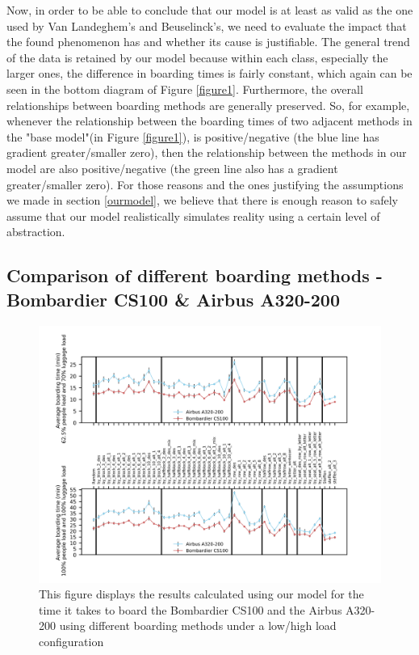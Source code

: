 \documentclass[11pt]{article}
\begin{document}
Now, in order to be able to conclude that our model is at least as valid as the one used by Van Landeghem's and Beuselinck's, we need to evaluate the impact that the found phenomenon has and whether its cause is justifiable. 
The general trend of the data is retained by our model because within each class, especially the larger ones, the difference in boarding times is fairly constant, which again can be seen in the bottom diagram of Figure \ref{figure1}. Furthermore, the overall relationships between boarding methods are generally preserved. So, for example, whenever the relationship between the boarding times of two adjacent methods in the "base model"(in Figure \ref{figure1}), is positive/negative (the blue line has gradient greater/smaller zero), then the relationship between the methods in our model are also positive/negative (the green line also has a gradient greater/smaller zero). For those reasons and the ones justifying the assumptions we made in section \ref{ourmodel}, we believe that there is enough reason to safely assume that our model realistically simulates reality using a certain level of abstraction.  

\subsection{Comparison of different boarding methods - Bombardier CS100 \& Airbus A320-200}
\begin{figure}
	\includegraphics[width=\linewidth]{../../code/AirplaneBoarding/data/figure2/figure2.png}
	\caption{This figure displays the results calculated using our model for the time it takes to board the Bombardier CS100 and the Airbus A320-200 using different boarding methods under a low/high load configuration}
	\label{figure2}
\end{figure}
\end{document}
